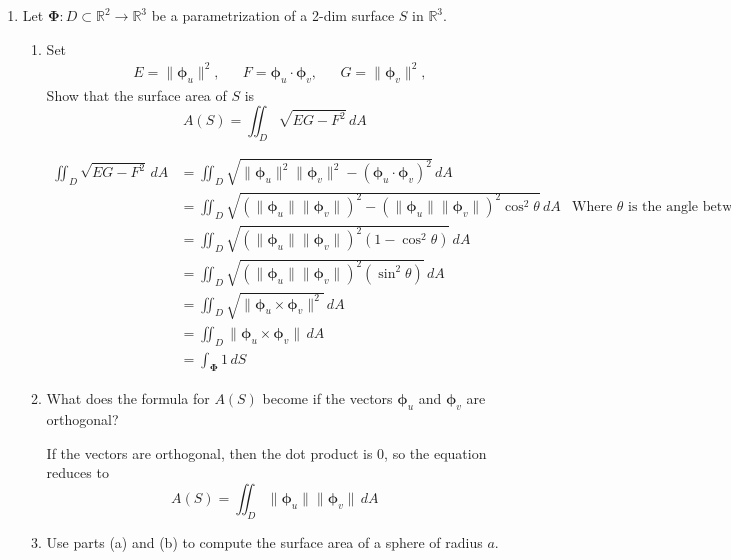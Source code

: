 \documentclass{article}
\newcommand{\norm}[1]{\| #1 \|}
\begin{document}
\begin{enumerate}
    \item Let $\boldsymbol \Phi : D \subset \mathbb{R}^2 \rightarrow \mathbb{R}^3$ be a parametrization of a 2-dim surface $S$ in $\mathbb{R}^3$.
    \begin{enumerate}
        \item Set
        \begin{align*}
            & E = \norm{\boldsymbol \phi_u}^2,& &F = \boldsymbol \phi_u \cdot \boldsymbol \phi_v, & & G = \norm{\boldsymbol \phi_v}^2,
        \end{align*} 
        Show that the surface area of $S$ is 
        \[ A(S) = \iint_D \sqrt{EG - F^2}\,dA \]
        
        \begin{align*}
            \iint_D \sqrt{EG - F^2}\,dA &= \iint_D \sqrt{\norm{\boldsymbol \phi_u}^2 \norm{\boldsymbol \phi_v}^2 - (\boldsymbol \phi_u \cdot \boldsymbol \phi_v)^2} \, dA \\
            &= \iint_D \sqrt{(\norm{\boldsymbol \phi_u}\norm{\boldsymbol \phi_v})^2 - (\norm{ \boldsymbol \phi_u} \norm{\boldsymbol \phi_v})^2 \cos^2\theta }\, dA & \text{Where $\theta$ is the angle between $\boldsymbol \phi_u$ and $\boldsymbol \phi_v$.}\\
            &= \iint_D \sqrt{(\norm{\boldsymbol \phi_u}\norm{\boldsymbol \phi_v})^2 (1 - \cos^2\theta) } \, dA \\
            &= \iint_D \sqrt{(\norm{\boldsymbol \phi_u}\norm{\boldsymbol \phi_v})^2 (\sin^2\theta) } \, dA \\
            &= \iint_D \sqrt{\norm{\boldsymbol \phi_u \times \boldsymbol \phi_v} ^2} \, dA \\
            &= \iint_D \norm{\boldsymbol \phi_u \times \boldsymbol \phi_v} \, dA \\
            &= \int_{\boldsymbol \Phi} 1\, dS
        \end{align*} 
        \item What does the formula for $A(S)$ become if the vectors $\boldsymbol \phi_u$ and $\boldsymbol \phi_v$ are orthogonal?


        If the vectors are orthogonal, then the dot product is 0, so the equation reduces to 
        \[ A(S) = \iint_D \norm{\boldsymbol \phi_u} \norm{\boldsymbol \phi_v}\, dA \]
        \item Use parts (a) and (b) to compute the surface area of a sphere of radius $a$.


\end{enumerate}
\end{enumerate}
\end{document}
